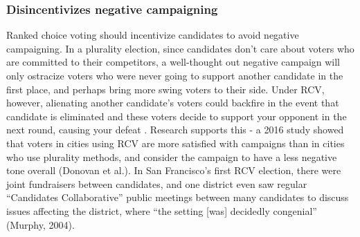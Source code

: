 \documentclass[12pt,twoside]{reedthesis}
\theoremstyle{definition}
\theoremstyle{definition}
\theoremstyle{definition}
\theoremstyle{remark}
\begin{document}
\hypertarget{disincentivizes-negative-campaigning}{%
\subsubsection{Disincentivizes negative
campaigning}\label{disincentivizes-negative-campaigning}}

Ranked choice voting should incentivize candidates to avoid negative
campaigning. In a plurality election, since candidates don't care about
voters who are committed to their competitors, a well-thought out
negative campaign will only ostracize voters who were never going to
support another candidate in the first place, and perhaps bring more
swing voters to their side. Under RCV, however, alienating another
candidate's voters could backfire in the event that candidate is
eliminated and these voters decide to support your opponent in the next
round, causing your defeat . Research supports this - a 2016 study
showed that voters in cities using RCV are more satisfied with campaigns
than in cities who use plurality methods, and consider the campaign to
have a less negative tone overall (Donovan et al.). In San Francisco's
first RCV election, there were joint fundraisers between candidates, and
one district even saw regular ``Candidates Collaborative'' public
meetings between many candidates to discuss issues affecting the
district, where ``the setting {[}was{]} decidedly congenial'' (Murphy,
2004).
\end{document}
